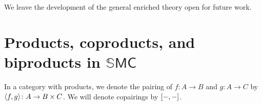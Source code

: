 \documentclass[11pt, oneside, article]{memoir}
\theoremstyle{plain}
\theoremstyle{definition}
\theoremstyle{remark}
\DeclarePairedDelimiter{\pair}{\langle}{\rangle}
\DeclarePairedDelimiter{\copair}{[}{]}
\begin{document}
We leave the development of the general enriched theory open for future work.


\printbibliography

\newpage
\appendix

\chapter{Products, coproducts, and biproducts in $\mathbb{S}\mathsf{MC}$}\label{chap.proofs}


In a category with products, we denote the pairing of $f\colon A\to B$ and $g\colon A\to C$ by $\pair{f,g}\colon A\to B\times C$. We will denote copairings by $\copair{-,-}$.
\end{document}
